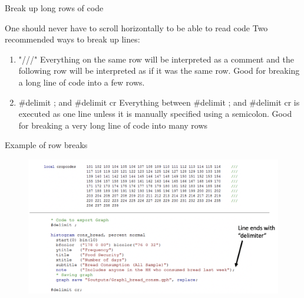 \documentclass[aspectratio=169]{beamer}
\begin{document}
\begin{frame}{Break up long rows of code}

One should never have to scroll horizontally to be able to read code
Two recommended ways to break up lines:

	\begin{enumerate}
	\item<1>  "///"
		\leavevmode 	\newline Everything on the same row will be interpreted as a comment and the following row will be interpreted as if it was the same row.
		\leavevmode 	\newline Good for breaking a long line of code into a few rows.
	
	\item<1>  {\#}delimit ;  and {\#}delimit cr 
		\leavevmode 	\newline Everything between {\#}delimit ; and  {\#}delimit cr is executed as one line unless it is manually specified using a semicolon.
		\leavevmode 	\newline  Good for breaking a very long line of code into many rows
	\end{enumerate}

\end{frame}


\begin{frame}{Example of row breaks}

\begin{figure}
	\centering
	\includegraphics[width=\linewidth]{img/Row_break}
\end{figure}

\end{frame}
\end{document}
